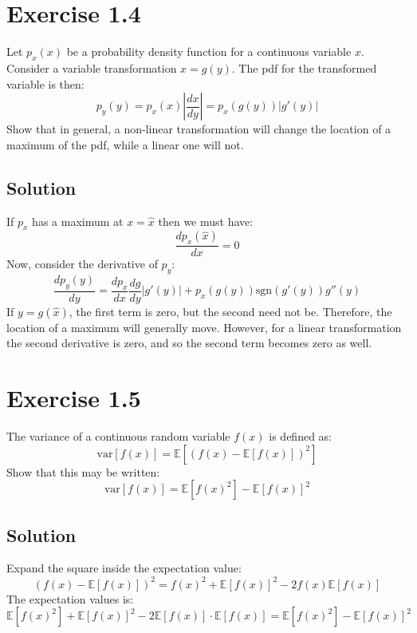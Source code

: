 \documentclass[12pt, a4paper]{article}
\numberwithin{equation}{section}
\begin{document}
\section{Exercise 1.4}
Let $p_x(x)$ be a probability density function for a continuous variable $x$. Consider a variable transformation $x=g(y)$. The pdf for the transformed variable is then:
\begin{equation}
p_y(y)=p_x(x)\left|\frac{dx}{dy}\right|=p_x(g(y))|g'(y)|
\end{equation} 
Show that in general, a non-linear transformation will change the location of a maximum of the pdf, while a linear one will not.

\subsection{Solution}
If $p_x$ has a maximum at $x=\hat{x}$ then we must have:
\begin{equation}
\frac{d p_x(\hat{x})}{dx}=0
\end{equation}
Now, consider the derivative of $p_y$:
\begin{equation}
\frac{d p_y(y)}{dy}=\frac{d p_x}{dx}\frac{dg}{dy}|g'(y)|+p_x(g(y))\textrm{sgn}(g'(y))g''(y)
\end{equation}
If $y=g(\hat{x})$, the first term is zero, but the second need not be. Therefore, the location of a maximum will generally move. However, for a linear transformation the second derivative is zero, and so the second term becomes zero as well.

\section{Exercise 1.5}
The variance of a continuous random variable $f(x)$ is defined as:
\begin{equation}
\textrm{var}[f(x)]=\mathbb{E}[(f(x)-\mathbb{E}[f(x)])^2]
\end{equation}
Show that this may be written:
\begin{equation}
\textrm{var}[f(x)]=\mathbb{E}[f(x)^2]-\mathbb{E}[f(x)]^2
\end{equation}

\subsection{Solution}
Expand the square inside the expectation value:
\begin{equation}
(f(x)-\mathbb{E}[f(x)])^2=f(x)^2+\mathbb{E}[f(x)]^2-2f(x)\mathbb{E}[f(x)]
\end{equation}
The expectation values is:
\begin{equation}
\mathbb{E}[f(x)^2]+\mathbb{E}[f(x)]^2-2\mathbb{E}[f(x)]\cdot\mathbb{E}[f(x)]=\mathbb{E}[f(x)^2]-\mathbb{E}[f(x)]^2
\end{equation}
\end{document}
